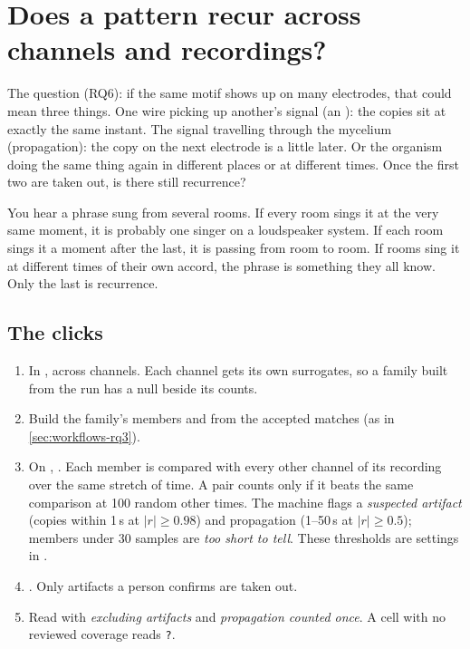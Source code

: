 \section{Does a pattern recur across channels and recordings?}\label{sec:workflows-rq6}
The question (RQ6): if the same motif shows up on many electrodes, that could mean three
things. One wire picking up another's signal (an ): the copies sit at
exactly the same instant. The signal travelling through the mycelium (propagation): the copy
on the next electrode is a little later. Or the organism doing the same thing again in
different places or at different times. Once the first two are taken out, is there still
recurrence?

\begin{plainterms}
You hear a phrase sung from several rooms. If every room sings it at the very same moment,
it is probably one singer on a loudspeaker system. If each room sings it a moment after the
last, it is passing from room to room. If rooms sing it at different times of their own
accord, the phrase is something they all know. Only the last is recurrence.
\end{plainterms}

\subsection*{The clicks}
\begin{enumerate}
\item In ,  across channels. Each channel gets
  its own surrogates, so a family built from the run has a null beside its counts.
\item Build the family's members and  from the accepted matches (as in
  \cref{sec:workflows-rq3}).
\item On , . Each member is compared with
  every other channel of its recording over the same stretch of time. A pair counts only if it
  beats the same comparison at 100 random other times. The machine flags a \emph{suspected
  artifact} (copies within 1\,s at $|r| \geq 0.98$) and propagation (1--50\,s at
  $|r| \geq 0.5$); members under 30 samples are \emph{too short to tell}. These thresholds
  are settings in .
\item {}. Only artifacts a person confirms are taken out.
\item Read  with \emph{excluding artifacts} and
  \emph{propagation counted once}. A cell with no reviewed coverage reads \texttt{?}.
\end{enumerate}

